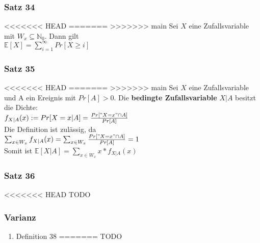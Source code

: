 \documentclass[11pt]{article}
\begin{document}
\begin{enumerate}
\subsubsection{Satz 34}
<<<<<<< HEAD
\label{sec:orgda7a22c}
=======
\label{sec:org1722f5a}
>>>>>>> main
Sei \(X\) eine Zufallsvariable mit \(W_x \subseteq \mathbb{N}_0\). Dann gilt\\
\(\mathbb{E}[X] = \sum_{i=1}^\infty Pr[X \geq i]\)

\subsubsection{Satz 35}
<<<<<<< HEAD
\label{sec:org5aa6e8f}
=======
\label{sec:org2d68a89}
>>>>>>> main
Sei \(X\) eine Zufallsvariable und A ein Ereignis mit \(Pr[A] > 0\). Die \textbf{bedingte Zufallsvariable} \(X|A\) besitzt die Dichte:\\
\(f_{X|A}(x) := Pr[X=x|A] = \frac{Pr["X=x" \cap A]}{Pr[A]}\) \\
Die Definition ist zulässig, da \\
\(\sum_{x \in W_x} f_{X|A}(x) = \sum_{x \in W_x} \frac{Pr["X=x" \cap A]}{Pr[A]} = 1\) \\
Somit ist \(\mathbb{E}[X|A] = \sum_{x \in W_x} x * f_{X|A}(x)\)

\subsubsection{Satz 36}
<<<<<<< HEAD
\label{sec:orge3342bb}
TODO

\subsubsection{Varianz}
\label{sec:org3b33610}
\begin{enumerate}
\item Definition 38
\label{sec:org1f78d4b}
=======
\label{sec:org6c35eb7}
TODO


\end{enumerate}
\end{enumerate}
\end{document}
